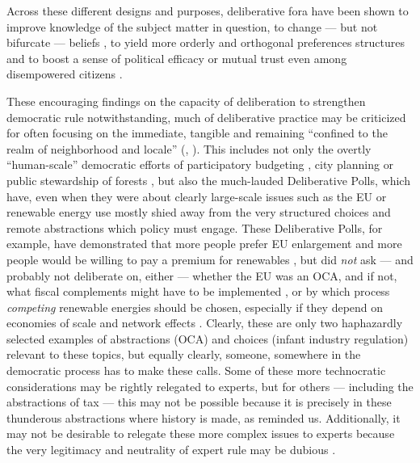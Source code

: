 
Across these different designs and purposes, deliberative fora have been shown to improve knowledge of the subject matter in question, to change --- but not bifurcate --- beliefs \citep{Fishkin2009}, to yield more orderly and orthogonal preferences structures \citep{Farrar2003} and to boost a sense of political efficacy or mutual trust even among disempowered citizens \citep{Karpowitz2009}.

These encouraging findings on the capacity of deliberation to strengthen democratic rule notwithstanding, much of deliberative practice may be criticized for often focusing on the immediate, tangible and remaining ``confined to the realm of neighborhood and locale'' (\citealt[759]{Boggs-1997-aa}, \citealt[17]{FungWright-2001-aa}). 
This includes not only the overtly ``human-scale'' democratic efforts \citep{Boggs-1997-aa} of participatory budgeting \citep{Sousa-Santos-1998-aa}, city planning \citep{Sokoloff2005} or public stewardship of forests \citep{Cheng2005}, but also the much-lauded Deliberative Polls, which have, even when they were about clearly large-scale issues such as the \gls{EU} \citep{Fishkin2009} or renewable energy use \citep{LehrGuild-2003-aa} mostly shied away from the very structured choices and remote abstractions which policy must engage. 
These Deliberative Polls, for example, have demonstrated that more people prefer \gls{EU} enlargement and more people would be willing to pay a premium for renewables \citep[K2013]{Fishkin2009}, but did \emph{not} ask --- and probably not deliberate on, either --- whether the \gls{EU} was an \gls{OCA}, and if not, what fiscal complements might have to be implemented \citep{Mundell1961}, or by which process \emph{competing} renewable energies should be chosen, especially if they depend on economies of scale and network effects \citep[for example, ][]{Krugman-1990-aa}.
Clearly, these are only two haphazardly selected examples of abstractions (\gls{OCA}) and choices (infant industry regulation) relevant to these topics, but equally clearly, someone, somewhere in the democratic process has to make these calls.
Some of these more technocratic considerations may be rightly relegated to experts, but for others --- including the abstractions of tax --- this may not be possible because it is precisely in these thunderous abstractions where history is made, as \citeauthor{SchumpeterSwedberg-1942-aa} reminded us.
Additionally, it may not be desirable to relegate these more complex issues to experts because the very legitimacy and neutrality of expert rule may be dubious \citep{Blok2007,Haas1992}. %

